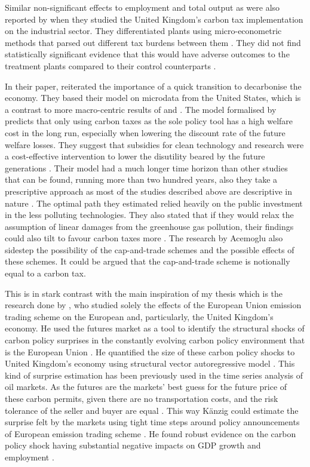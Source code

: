 \documentclass[
]{article}
\begin{document}
Similar non-significant effects to employment and total output as \citet{metcalf2020} were also reported by \citet{martin2014} when they studied the United Kingdom's carbon tax implementation on the industrial sector. They differentiated plants using micro-econometric methods that parsed out different tax burdens between them \citep{martin2014}. They did not find statistically significant evidence that this would have adverse outcomes to the treatment plants compared to their control counterparts \citep{martin2014}.

In their paper, \citet{acemoglu2016} reiterated the importance of a quick transition to decarbonise the economy. They based their model on microdata from the United States, which is a contrast to more macro-centric results of \citet{metcalf2020} and \citet{andersson2019}. The model formalised by \citeauthor{acemoglu2016} predicts that only using carbon taxes as the sole policy tool has a high welfare cost in the long run, especially when lowering the discount rate of the future welfare losses. They suggest that subsidies for clean technology and research were a cost-effective intervention to lower the disutility beared by the future generations \citep{acemoglu2016}. Their model had a much longer time horizon than other studies that can be found, running more than two hundred years, also they take a prescriptive approach as most of the studies described above are descriptive in nature \citep{acemoglu2016}. The optimal path they estimated relied heavily on the public investment in the less polluting technologies. They also stated that if they would relax the assumption of linear damages from the greenhouse gas pollution, their findings could also tilt to favour carbon taxes more \citep{acemoglu2016}. The research by Acemoglu also sidestep the possibility of the cap-and-trade schemes and the possible effects of these schemes. It could be argued that the cap-and-trade scheme is notionally equal to a carbon tax.

This is in stark contrast with the main inspiration of my thesis which is the research done by \citet{kaenzig2022}, who studied solely the effects of the European Union emission trading scheme on the European and, particularly, the United Kingdom's economy. He used the futures market as a tool to identify the structural shocks of carbon policy surprises in the constantly evolving carbon policy environment that is the European Union \citep{kaenzig2022}. He quantified the size of these carbon policy shocks to United Kingdom's economy using structural vector autoregressive model \citep{kaenzig2022}. This kind of surprise estimation has been previously used in the time series analysis of oil markets. As the futures are the markets' best guess for the future price of these carbon permits, given there are no transportation costs, and the risk tolerance of the seller and buyer are equal \citep{nakamura2018}. This way Känzig could estimate the surprise felt by the markets using tight time steps around policy announcements of European emission trading scheme \citep{kaenzig2022}. He found robust evidence on the carbon policy shock having substantial negative impacts on GDP growth and employment \citep{kaenzig2022}.
\end{document}
